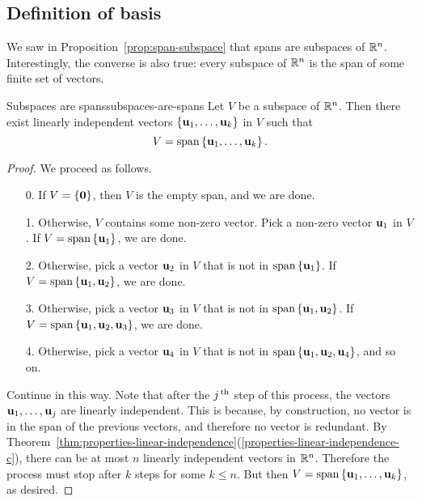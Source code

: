 \subsection{Definition of basis}

We saw in Proposition~\ref{prop:span-subspace} that spans are
subspaces of $\mathbb{R}^n$. Interestingly, the converse is also true: every
subspace of $\mathbb{R}^n$ is the span of some finite set of vectors.

\begin{theorem}{Subspaces are spans}{subspaces-are-spans}
  Let $V$ be a subspace of\/ $\mathbb{R}^n$. Then there exist linearly
  independent vectors $\left\{\mbox{\bf u}_{1},\ldots,\mbox{\bf u}_{k}\right\}$ in $V$
  such that
  \begin{equation*}
    V= \sspan\set{\vect{u}_{1},\ldots ,\vect{u}_{k}}. 
  \end{equation*}%
  \vspace{-3ex}
\end{theorem}

\begin{proof}
  We proceed as follows.
  \begin{enumerate}
  \item[0.] If $V=\left\{\mbox{\bf 0}\right\}$, then $V$ is the empty span, and we
    are done.
  \item[1.] Otherwise, $V$ contains some non-zero vector.  Pick a
    non-zero vector $\mbox{\bf u}_{1}$ in $V$. If
    $V=\sspan\set{\vect{u}_{1}}$, we are done.
  \item[2.] Otherwise, pick a vector $\mbox{\bf u}_{2}$ in $V$ that is not
    in $\sspan\set{\vect{u}_{1}}$. If
    $V=\sspan\set{\vect{u}_{1},\vect{u}_{2}}$, we are done.
  \item[3.] Otherwise, pick a vector $\mbox{\bf u}_{3}$ in $V$ that is not
    in $\sspan\set{\vect{u}_{1},\vect{u}_{2}}$. If
    $V=\sspan\set{\vect{u}_{1},\vect{u}_{2},\vect{u}_{3}}$, we are done.
  \item[4.] Otherwise, pick a vector $\mbox{\bf u}_{4}$ in $V$ that is not
    in $\sspan\set{\vect{u}_{1},\vect{u}_{2},\vect{u}_{4}}$, and so on.
  \end{enumerate}
  Continue in this way. Note that after the $j^{\,\rm th}$ step of this
  process, the vectors $\mbox{\bf u}_1,\ldots,\mbox{\bf u}_j$ are linearly
  independent. This is because, by construction, no vector is in the
  span of the previous vectors, and therefore no vector is redundant.
  By
  Theorem~\ref{thm:properties-linear-independence}(\ref{properties-linear-independence-c}),
  there can be at most $n$ linearly independent vectors in $\mathbb{R}^n$.
  Therefore the process must stop after $k$ steps for some $k\leq
  n$. But then $V=\sspan\set{\vect{u}_{1},\ldots ,\vect{u}_{k}}$, as
  desired.
\end{proof}

